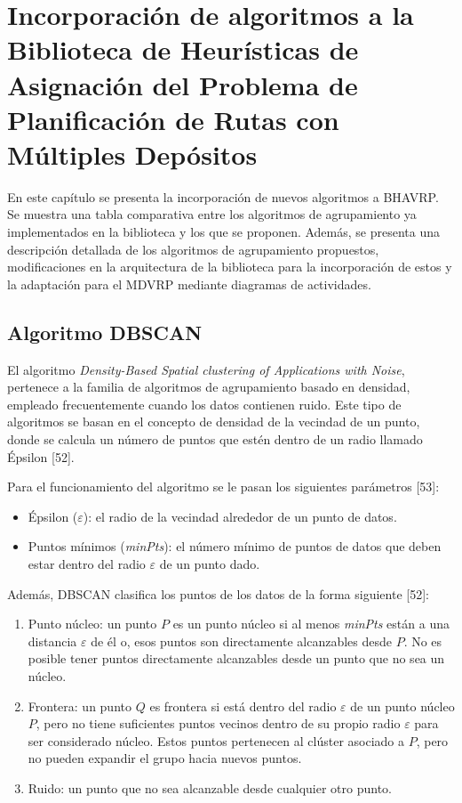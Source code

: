 \chapter{Incorporaci\'on de algoritmos a la Biblioteca de Heur\'isticas de Asignaci\'on del Problema de Planificaci\'on de Rutas con M\'ultiples Dep\'ositos}

En este cap\'itulo se presenta la incorporaci\'on de nuevos algoritmos a BHAVRP. Se muestra una tabla comparativa entre los algoritmos de agrupamiento ya implementados en la biblioteca y los que se proponen. Adem\'as, se presenta una descripci\'on detallada de los algoritmos de agrupamiento propuestos, modificaciones en la arquitectura de la biblioteca para la incorporaci\'on de estos y la adaptaci\'on para el MDVRP mediante diagramas de actividades.

\section{Algoritmo DBSCAN}

El algoritmo \textit{Density-Based Spatial clustering of Applications with Noise}, pertenece a la familia de algoritmos de agrupamiento basado en densidad, empleado frecuentemente cuando los datos contienen ruido. Este tipo de algoritmos se basan en el concepto de densidad de la vecindad de un punto, donde se calcula un n\'umero de puntos que est\'en dentro de un radio llamado \'Epsilon [52].

Para el funcionamiento del algoritmo se le pasan los siguientes par\'ametros [53]:

\begin{itemize}
  \item \'Epsilon ($\varepsilon$): el radio de la vecindad alrededor de un punto de datos.
  \item Puntos m\'inimos (\textit{minPts}): el n\'umero m\'inimo de puntos de datos que deben estar dentro del radio $\varepsilon$ de un punto dado.
\end{itemize}

Adem\'as, DBSCAN clasifica los puntos de los datos de la forma siguiente [52]:

\begin{enumerate}
  \item Punto n\'ucleo: un punto $P$ es un punto n\'ucleo si al menos \textit{minPts} est\'an a una distancia $\varepsilon$ de \'el o, esos puntos son directamente alcanzables desde $P$. No es posible tener puntos directamente alcanzables desde un punto que no sea un n\'ucleo.
  \item Frontera: un punto $Q$ es frontera si est\'a dentro del radio $\varepsilon$ de un punto n\'ucleo $P$, pero no tiene suficientes puntos vecinos dentro de su propio radio $\varepsilon$ para ser considerado n\'ucleo. Estos puntos pertenecen al cl\'uster asociado a $P$, pero no pueden expandir el grupo hacia nuevos puntos.
  \item Ruido: un punto que no sea alcanzable desde cualquier otro punto.
\end{enumerate}


